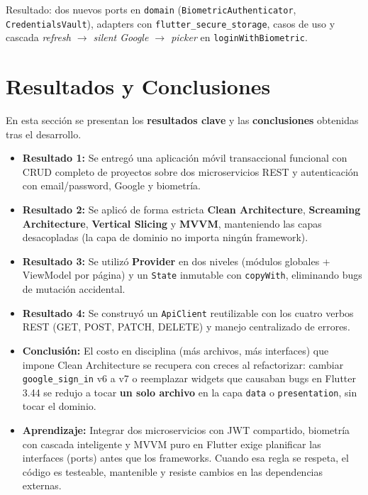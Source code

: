 \documentclass[12pt, a4paper]{article} %
\begin{document}
Resultado: dos nuevos ports en \texttt{domain}
(\texttt{BiometricAuthenticator}, \texttt{CredentialsVault}), adapters
con \texttt{flutter\_secure\_storage}, casos de uso y cascada
\textit{refresh $\to$ silent Google $\to$ picker} en
\texttt{loginWithBiometric}.

\section{Resultados y Conclusiones}
\label{sec:resultados}
En esta sección se presentan los \textbf{resultados clave} y las
\textbf{conclusiones} obtenidas tras el desarrollo.

\begin{itemize}
    \item \textbf{Resultado 1:} Se entregó una aplicación móvil
    transaccional funcional con CRUD completo de proyectos sobre dos
    microservicios REST y autenticación con email/password, Google y
    biometría.
    \item \textbf{Resultado 2:} Se aplicó de forma estricta
    \textbf{Clean Architecture}, \textbf{Screaming Architecture},
    \textbf{Vertical Slicing} y \textbf{MVVM}, manteniendo las capas
    desacopladas (la capa de dominio no importa ningún framework).
    \item \textbf{Resultado 3:} Se utilizó \textbf{Provider} en dos
    niveles (módulos globales + ViewModel por página) y un \texttt{State}
    inmutable con \texttt{copyWith}, eliminando bugs de mutación
    accidental.
    \item \textbf{Resultado 4:} Se construyó un \texttt{ApiClient}
    reutilizable con los cuatro verbos REST (GET, POST, PATCH, DELETE)
    y manejo centralizado de errores.
    \item \textbf{Conclusión:} El costo en disciplina (más archivos,
    más interfaces) que impone Clean Architecture se recupera con
    creces al refactorizar: cambiar \texttt{google\_sign\_in} v6 a v7 o
    reemplazar widgets que causaban bugs en Flutter 3.44 se redujo a
    tocar \textbf{un solo archivo} en la capa \texttt{data} o
    \texttt{presentation}, sin tocar el dominio.
    \item \textbf{Aprendizaje:} Integrar dos microservicios con JWT
    compartido, biometría con cascada inteligente y MVVM puro en
    Flutter exige planificar las interfaces (ports) antes que los
    frameworks. Cuando esa regla se respeta, el código es testeable,
    mantenible y resiste cambios en las dependencias externas.
\end{itemize}
\end{document}
